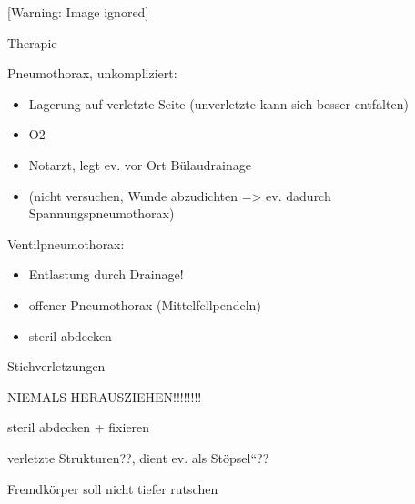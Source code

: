 \documentclass{article}
\begin{document}
\begin{center}
 [Warning: Image ignored] %

\end{center}
{\mdseries\color{black}
Therapie}

{\mdseries
Pneumothorax, unkompliziert:}

\begin{itemize}
\item {\mdseries\color[rgb]{0.0,0.0,0.5019608}
Lagerung auf verletzte Seite (unverletzte kann  sich besser entfalten)}

\item {\mdseries\color[rgb]{0.0,0.0,0.5019608}
O2}

\item {\mdseries\color[rgb]{0.0,0.0,0.5019608}
Notarzt, legt ev. vor Ort B\"ulaudrainage}

\item {\mdseries\color[rgb]{0.0,0.0,0.5019608}
(nicht versuchen, Wunde abzudichten ={\textgreater} ev. dadurch
Spannungspneumothorax)}

\end{itemize}
{\mdseries
Ventilpneumothorax:}

\begin{itemize}
\item {\mdseries\color[rgb]{0.0,0.0,0.5019608}
Entlastung durch Drainage!}

\item {\mdseries\color[rgb]{0.0,0.0,0.5019608}
offener Pneumothorax (Mittelfellpendeln)}

\item {\mdseries\color[rgb]{0.0,0.0,0.5019608}
steril abdecken}

\end{itemize}
{\mdseries\color[rgb]{0.0,0.0,0.5019608}
Stichverletzungen}

{\mdseries
NIEMALS  HERAUSZIEHEN!!!!!!!!}

{\mdseries
steril abdecken + fixieren}

{\mdseries
verletzte Strukturen??, dient ev. als 
{\quotedblbase}St\"opsel{\textquotedblleft}??}

{\mdseries
Fremdk\"orper soll nicht tiefer rutschen}
\end{document}
